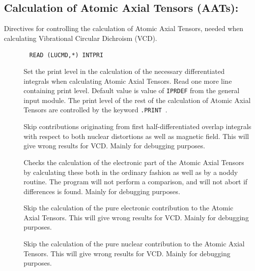 \subsection{Calculation of Atomic Axial Tensors (AATs):
}\label{sec:aat}

Directives for controlling the calculation of Atomic Axial
Tensors,
needed when calculating Vibrational Circular Dichroism
(VCD).
\begin{description}

\item[]\verb| |\newline
\verb|READ (LUCMD,*) INTPRI|

Set the print level in the calculation of the necessary differentiated
integrals when calculating Atomic Axial Tensors. Read one more line
containing print level. Default value is value of \verb|IPRDEF|
from the general input module. The print level of the rest of the
calculation of Atomic Axial Tensors are controlled by the keyword
\verb|.PRINT |.

\item[] Skip contributions originating from first
half-differentiated overlap
integrals with respect to both nuclear
distortions as well as magnetic field. This will give wrong results
for VCD. Mainly for debugging purposes.

\item[] Checks the calculation of the electronic part of
the Atomic Axial Tensors by calculating these both in the ordinary
fashion as well as by a noddy routine. The program will not
perform a comparison, and will not abort if differences is found.
Mainly for debugging purposes.

\item[] Skip the calculation of the pure electronic
contribution to the Atomic Axial Tensors. This will give wrong results
for VCD. Mainly for debugging purposes.

\item[] Skip the calculation of the pure nuclear
contribution to the Atomic Axial Tensors. This will give wrong results
for VCD. Mainly for debugging purposes.


\end{description}
